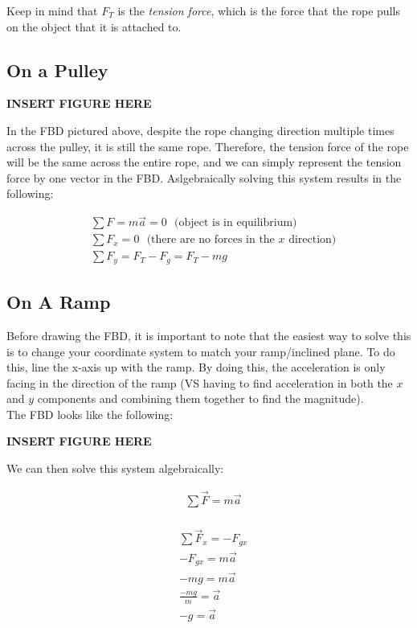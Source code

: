 Keep in mind that $F_T$ is the \textit{tension force}, which is the force that the rope pulls on the object that it is attached to.

\subsection*{On a Pulley}

\textbf{INSERT FIGURE HERE}

In the FBD pictured above, despite the rope changing direction multiple times across the pulley, it is still the same rope. Therefore, the tension force of the rope will be the same across the entire rope, and we can simply represent the tension force by one vector in the FBD. Aslgebraically solving this system results in the following:

$$
	\begin{aligned}
		&\sum F = m\vec{a} = 0 \:\:\:\text{(object is in equilibrium)}\\
		&\sum F_x = 0 \:\:\:\text{(there are no forces in the $x$ direction)}\\
		&\sum F_y = F_T - F_g = F_T - mg
	\end{aligned}
$$

\subsection*{On A Ramp}

Before drawing the FBD, it is important to note that the easiest way to solve this is to change your coordinate system to match your ramp/inclined plane. To do this, line the x-axis up with the ramp. By doing this, the acceleration is only facing in the direction of the ramp (VS having to find acceleration in both the $x$ and $y$ components and combining them together to find the magnitude).\\

The FBD looks like the following:

\textbf{INSERT FIGURE HERE}

We can then solve this system algebraically:

$$
	\begin{aligned}
		&\sum \vec F = m\vec{a}\\
	\end{aligned}
$$

$$
	\begin{aligned}
		&\sum \vec F_x = -F_{gx}\\
		&-F_{gx} = m\vec{a}\\
		&-mg = m\vec{a}\\
		&\frac{-mg}{m} = \vec{a}\\
		&{-g} = \vec{a}
	\end{aligned}
$$

